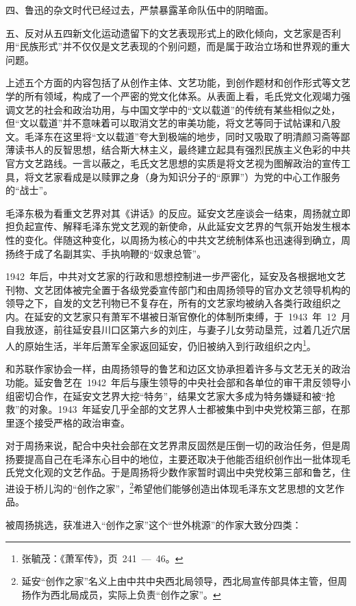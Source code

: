 四、鲁迅的杂文时代已经过去，严禁暴露革命队伍中的阴暗面。

五、反对从五四新文化运动遗留下的文艺表现形式上的欧化倾向，文艺家是否利用“民族形式”并不仅仅是文艺表现的个别问题，而是属于政治立场和世界观的重大问题。

上述五个方面的内容包括了从创作主体、文艺功能，到创作题材和创作形式等文艺学的所有领域，构成了一个严密的党文化体系。从表面上看，毛氏党文化观竭力强调文艺的社会和政治功用，与中国文学中的“文以载道”的传统有某些相似之处，但“文以载道”并不意味着可以取消文艺的审美功能，将文艺等同于试帖课和八股文。毛泽东在这里将“文以载道”夸大到极端的地步，同时又吸取了明清颜习斋等鄙薄读书人的反智思想，结合斯大林主义，最终建立起具有强烈民族主义色彩的中共官方文艺路线。一言以蔽之，毛氏文艺思想的实质是将文艺视为图解政治的宣传工具，将文艺家看成是以赎罪之身（身为知识分子的“原罪”）为党的中心工作服务的“战士”。

毛泽东极为看重文艺界对其《讲话》的反应。延安文艺座谈会一结束，周扬就立即担负起宣传、解释毛泽东党文艺观的新使命，从此延安文艺界的气氛开始发生根本性的变化。伴随这种变化，以周扬为核心的中共文艺统制体系也迅速得到确立，周扬终于成了名副其实、手执响鞭的“奴隶总管”。

1942~年后，中共对文艺家的行政和思想控制进一步严密化，延安及各根据地文艺刊物、文艺团体被完全置于各级党委宣传部门和由周扬领导的官办文艺领导机构的领导之下，自发的文艺刊物已不复存在，所有的文艺家均被纳入各类行政组织之内。在延安的文艺家只有萧军不堪被日渐官僚化的体制所束缚，于~1943~年~12~月自我放逐，前往延安县川口区第六乡的刘庄，与妻子儿女劳动垦荒，过着几近穴居人的原始生活，半年后萧军全家返回延安，仍旧被纳入到行政组织之内\footnote{张毓茂：《萧军传》，页~241~—~46。}。

和苏联作家协会一样，由周扬领导的鲁艺和边区文协承担着许多与文艺无关的政治功能。延安鲁艺在~1942~年后与康生领导的中央社会部和各单位的审干肃反领导小组密切合作，在延安文艺界大挖“特务”，结果文艺家大多成为特务嫌疑和被“抢救”的对象。1943~年延安几乎全部的文艺界人士都被集中到中央党校第三部，在那里逐个接受严格的政治审查。

对于周扬来说，配合中央社会部在文艺界肃反固然是压倒一切的政治任务，但是周扬要提高自己在毛泽东心目中的地位，主要还取决于他能否组织创作出一批体现毛氏党文化观的文艺作品。于是周扬将少数作家暂时调出中央党校第三部和鲁艺，住进设于桥儿沟的“创作之家”，\footnote{延安“创作之家”名义上由中共中央西北局领导，西北局宣传部具体主管，但周扬作为西北局成员，实际上负责“创作之家”。}希望他们能够创造出体现毛泽东文艺思想的文艺作品。

被周扬挑选，获准进入“创作之家”这个“世外桃源”的作家大致分四类：


